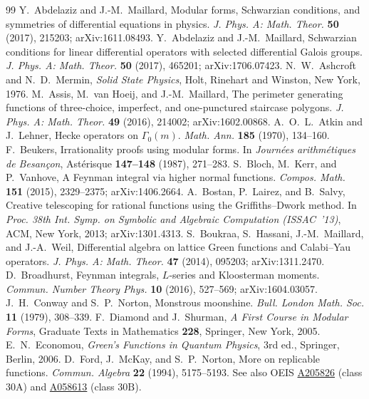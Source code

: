 \documentclass[cntp]{ipart}
\theoremstyle{plain}
\theoremstyle{remark}
\begin{document}
\begin{thebibliography}{99}
 Y.~Abdelaziz and J.-M.~Maillard, Modular forms, Schwarzian conditions, and symmetries of differential equations in physics. \textit{J. Phys. A: Math. Theor.} \textbf{50} (2017), 215203; arXiv:1611.08493.
 Y.~Abdelaziz and J.-M.~Maillard, Schwarzian conditions for linear differential operators with selected differential Galois groups. \textit{J. Phys. A: Math. Theor.} \textbf{50} (2017), 465201; arXiv:1706.07423.
 N.~W.~Ashcroft and N.~D.~Mermin, \textit{Solid State Physics}, Holt, Rinehart and Winston, New York, 1976.
 M.~Assis, M.~van Hoeij, and J.-M.~Maillard, The perimeter generating functions of three-choice, imperfect, and one-punctured staircase polygons. \textit{J. Phys. A: Math. Theor.} \textbf{49} (2016), 214002; arXiv:1602.00868.
 A.~O.~L.~Atkin and J.~Lehner, Hecke operators on $\Gamma_0(m)$. \textit{Math. Ann.} \textbf{185} (1970), 134--160.
 F.~Beukers, Irrationality proofs using modular forms. In \textit{Journ\'ees arithm\'etiques de Besan\c{c}on}, Ast\'erisque \textbf{147--148} (1987), 271--283.
 S.~Bloch, M.~Kerr, and P.~Vanhove, A Feynman integral via higher normal functions. \textit{Compos. Math.} \textbf{151} (2015), 2329--2375; arXiv:1406.2664.
 A.~Bostan, P.~Lairez, and B.~Salvy, Creative telescoping for rational functions using the Griffiths--Dwork method. In \textit{Proc. 38th Int. Symp. on Symbolic and Algebraic Computation (ISSAC~'13)}, ACM, New York, 2013; arXiv:1301.4313.
 S.~Boukraa, S.~Hassani, J.-M.~Maillard, and J.-A.~Weil, Differential algebra on lattice Green functions and Calabi--Yau operators. \textit{J. Phys. A: Math. Theor.} \textbf{47} (2014), 095203; arXiv:1311.2470.
 D.~Broadhurst, Feynman integrals, $L$-series and Kloosterman moments. \textit{Commun. Number Theory Phys.} \textbf{10} (2016), 527--569; arXiv:1604.03057.
 J.~H.~Conway and S.~P.~Norton, Monstrous moonshine. \textit{Bull. London Math. Soc.} \textbf{11} (1979), 308--339.
 F.~Diamond and J.~Shurman, \textit{A First Course in Modular Forms}, Graduate Texts in Mathematics \textbf{228}, Springer, New York, 2005.
 E.~N.~Economou, \textit{Green's Functions in Quantum Physics}, 3rd ed., Springer, Berlin, 2006.
 D.~Ford, J.~McKay, and S.~P.~Norton, More on replicable functions. \textit{Commun. Algebra} \textbf{22} (1994), 5175--5193. See also OEIS \href{https://oeis.org/A205826}{A205826} (class $30\mathrm{A}$) and \href{https://oeis.org/A058613}{A058613} (class $30\mathrm{B}$).

\end{thebibliography}
\end{document}
